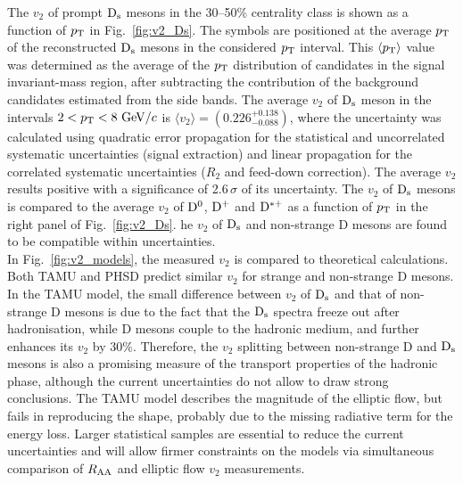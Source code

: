 The $v_2$ of prompt ${\rm D_s}$ mesons in
the 30--50\% centrality class is shown as a function of $p_{\rm T}$ in Fig.~\ref{fig:v2_Ds}.
The symbols are positioned at the average $p_{\rm T}$ of the 
reconstructed ${\rm D_s}$ mesons in the considered $p_{\rm T}$ interval. This $\langle p_{\rm T} \rangle$ value was determined as the 
average of the $p_{\rm T}$ distribution of candidates in the signal invariant-mass region, 
after subtracting the contribution of the background 
candidates estimated from the side bands.
The average $v_2$ of ${\rm D_s}$ meson in
 the intervals $2<p_{\rm T}<8~\mathrm{GeV}/c$ is $\langle v_2 \rangle = (0.226 ^{+0.138}_{-0.088})$,
where the uncertainty was calculated using quadratic error propagation for the
 statistical and uncorrelated systematic uncertainties 
(signal extraction) and linear propagation for the correlated 
systematic uncertainties ($R_2$ and feed-down correction). The average $v_2$ results
 positive with a significance of 2.6\,$\sigma$ of its uncertainty.
The $v_2$ of ${\rm D_s}$ mesons is compared to the average $v_2$ of
${\rm D^0}$, ${\rm D^+}$ and ${\rm D^{*+}}$ as a function of $p_{\rm T}$ in the right
panel of Fig.~\ref{fig:v2_Ds}. he $v_2$ of ${\rm D_s}$ and non-strange D mesons are found
to be compatible within uncertainties.\\


In Fig.~\ref{fig:v2_models}, the measured $v_2$  is compared to theoretical calculations.
Both TAMU and PHSD predict similar $v_2$ for strange and non-strange
D mesons. In the TAMU model, the small difference between $v_2$ of ${\rm D_s}$ and that of
non-strange D mesons is due to the fact that the ${\rm D_s}$ spectra freeze out after
hadronisation, while D mesons couple to the hadronic medium,
and further enhances its $v_2$ by 30\%. Therefore,
the $v_2$ splitting between non-strange D and ${\rm D_s}$ mesons is also a promising measure of the transport
properties of the hadronic phase, although the current uncertainties do not allow to draw strong conclusions.
The TAMU model describes the magnitude of the elliptic flow, 
but fails in reproducing the shape, probably due to the missing radiative term for the energy loss. 
Larger statistical samples are essential to reduce the current
uncertainties and will allow firmer constraints on the models
via simultaneous comparison of $R_{\rm AA}$ and elliptic flow $v_2$
measurements.

